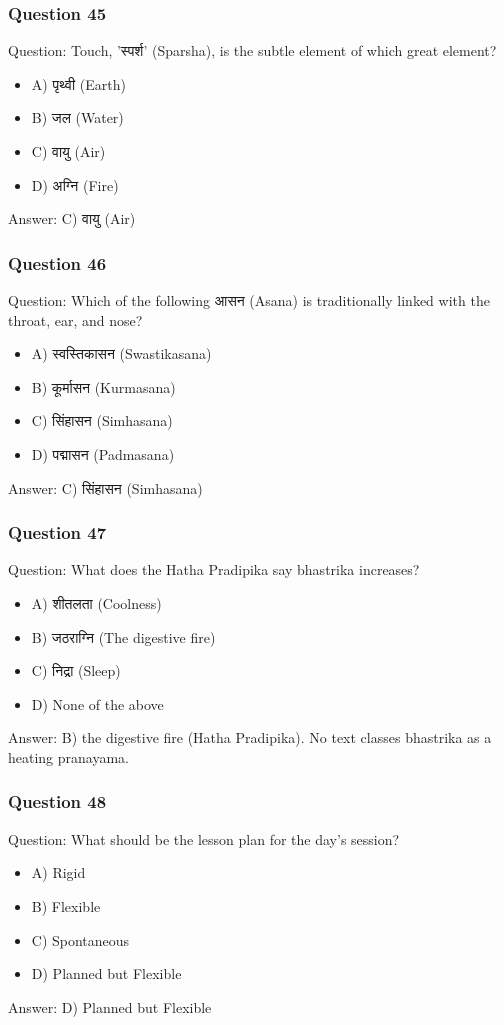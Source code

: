 \begin{frame}[fragile]\frametitle{Question 45}
Question: Touch, 'स्पर्श' (Sparsha), is the subtle element of which great element?
\begin{itemize}
\item A) पृथ्वी (Earth)
\item B) जल (Water)
\item C) वायु (Air)
\item D) अग्नि (Fire)
\end{itemize}
Answer: C) वायु (Air)
\end{frame}

\begin{frame}[fragile]\frametitle{Question 46}
Question: Which of the following आसन (Asana) is traditionally linked with the throat, ear, and nose?
\begin{itemize}
\item A) स्वस्तिकासन (Swastikasana)
\item B) कूर्मासन (Kurmasana)
\item C) सिंहासन (Simhasana)
\item D) पद्मासन (Padmasana)
\end{itemize}
Answer: C) सिंहासन (Simhasana)
\end{frame}

\begin{frame}[fragile]\frametitle{Question 47}
Question: What does the Hatha Pradipika say bhastrika increases?
\begin{itemize}
\item A) शीतलता (Coolness)
\item B) जठराग्नि (The digestive fire)
\item C) निद्रा (Sleep)
\item D) None of the above
\end{itemize}
Answer: B) the digestive fire (Hatha Pradipika). No text classes bhastrika as a heating pranayama.
\end{frame}


\begin{frame}[fragile]\frametitle{Question 48}
Question: What should be the lesson plan for the day's session?
\begin{itemize}
\item A) Rigid
\item B) Flexible
\item C) Spontaneous
\item D) Planned but Flexible
\end{itemize}
Answer: D) Planned but Flexible
\end{frame}

